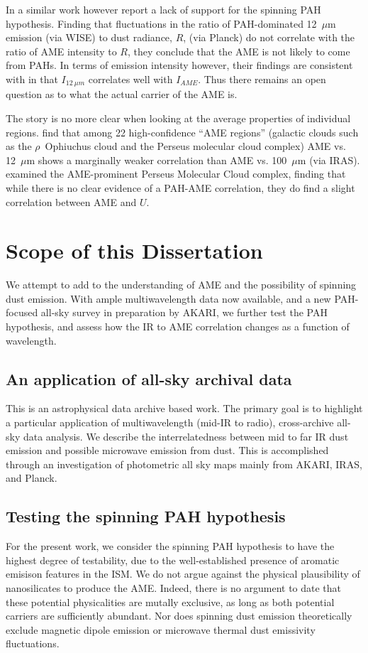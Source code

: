           In a similar work however \cite{hensley16} report a lack of support for the spinning PAH hypothesis. Finding that fluctuations in the ratio of PAH-dominated 12~$\mu$m emission (via WISE) to dust radiance, $R$, (via Planck) do not correlate with the ratio of AME intensity to $R$, they conclude that the AME is not likely to come from PAHs. In terms of emission intensity however, their findings are consistent with \cite{ysard10b} in that $I_{12~\mu{}m}$ correlates well with $I_{AME}$. Thus there remains an open question as to what the actual carrier of the AME is.

         The story is no more clear when looking at the average properties of individual regions. \cite{planckXV} find that among 22 high-confidence ``AME regions'' (galactic clouds such as the $\rho$~Ophiuchus cloud and the Perseus molecular cloud complex) AME vs. 12~$\mu$m  shows a marginally weaker correlation than AME vs. 100~$\mu$m (via IRAS). \cite{tibbs11} examined the AME-prominent Perseus Molecular Cloud complex, finding that while there is no clear evidence of a PAH-AME correlation, they do find a slight correlation between AME and  $U$.

\section{Scope of this Dissertation}

    We attempt to add to the understanding of AME and the possibility of spinning dust emission. With ample multiwavelength data now available, and a new PAH-focused all-sky survey in preparation by AKARI, we further test the PAH hypothesis, and assess how the IR to AME correlation changes as a function of wavelength.

  \subsection{An application of all-sky archival data}
    This is an astrophysical data archive based work. The primary goal is to highlight a particular application of multiwavelength (mid-IR to radio), cross-archive all-sky data analysis. We describe the interrelatedness between mid to far IR dust emission and possible microwave emission from dust. This is accomplished through an investigation of photometric all sky maps mainly from AKARI, IRAS, and Planck.

  \subsection{Testing the spinning PAH hypothesis}
    For the present work, we consider the spinning PAH hypothesis to have the highest degree of testability, due to the well-established presence of aromatic emisison features in the ISM.  We do not argue against the physical plausibility of nanosilicates to produce the AME. Indeed, there is no argument to date that these potential physicalities are mutally exclusive, as long as both potential carriers are sufficiently abundant. Nor does spinning dust emission theoretically exclude magnetic dipole emission or microwave thermal dust emissivity fluctuations.

